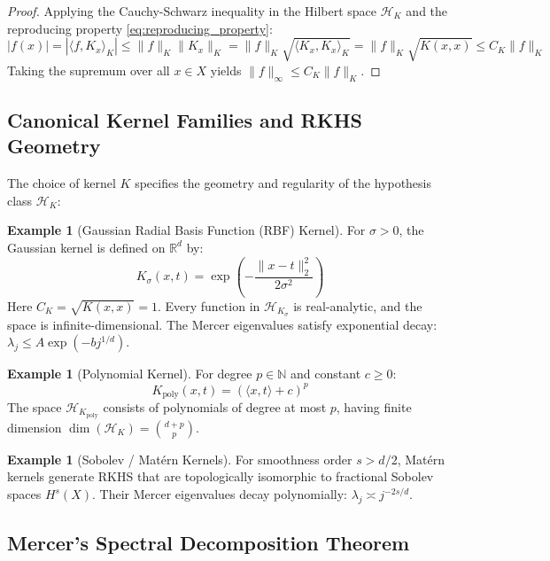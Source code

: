 \documentclass[11pt,a4paper]{article}
\theoremstyle{definition}
\newtheorem{example}[theorem]{Example}
\begin{document}
\begin{proof}
Applying the Cauchy-Schwarz inequality in the Hilbert space $\mathcal{H}_K$ and the reproducing property \eqref{eq:reproducing_property}:
\[
|f(x)| = |\langle f, K_x \rangle_K| \le \|f\|_K \|K_x\|_K = \|f\|_K \sqrt{\langle K_x, K_x \rangle_K} = \|f\|_K \sqrt{K(x, x)} \le C_K \|f\|_K
\]
Taking the supremum over all $x \in X$ yields $\|f\|_\infty \le C_K \|f\|_K$.
\end{proof}

\subsection{Canonical Kernel Families and RKHS Geometry}

The choice of kernel $K$ specifies the geometry and regularity of the hypothesis class $\mathcal{H}_K$:
\begin{example}[Gaussian Radial Basis Function (RBF) Kernel]
For $\sigma > 0$, the Gaussian kernel is defined on $\mathbb{R}^d$ by:
\begin{equation}\label{eq:rbf_kernel}
K_\sigma(x, t) = \exp\left( - \frac{\|x - t\|_2^2}{2 \sigma^2} \right)
\end{equation}
Here $C_K = \sqrt{K(x, x)} = 1$. Every function in $\mathcal{H}_{K_\sigma}$ is real-analytic, and the space is infinite-dimensional. The Mercer eigenvalues satisfy exponential decay: $\lambda_j \le A \exp(-b j^{1/d})$.
\end{example}

\begin{example}[Polynomial Kernel]
For degree $p \in \mathbb{N}$ and constant $c \ge 0$:
\begin{equation}\label{eq:poly_kernel}
K_{\text{poly}}(x, t) = (\langle x, t \rangle + c)^p
\end{equation}
The space $\mathcal{H}_{K_{\text{poly}}}$ consists of polynomials of degree at most $p$, having finite dimension $\dim(\mathcal{H}_K) = \binom{d+p}{p}$.
\end{example}

\begin{example}[Sobolev / Mat\'ern Kernels]
For smoothness order $s > d/2$, Mat\'ern kernels generate RKHS that are topologically isomorphic to fractional Sobolev spaces $H^s(X)$. Their Mercer eigenvalues decay polynomially: $\lambda_j \asymp j^{-2s/d}$.
\end{example}

\subsection{Mercer's Spectral Decomposition Theorem}
\end{document}
